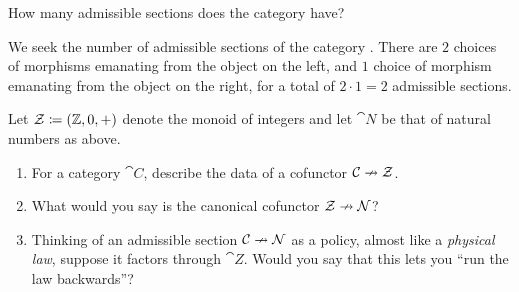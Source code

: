 \documentclass[Book-Poly]{subfiles}
\begin{document}
\begin{exercise}
How many admissible sections does the category \fbox{$\bullet\to\bullet$} have?
\begin{solution}
We seek the number of admissible sections of the category \fbox{$\bullet\to\bullet$}.
There are $2$ choices of morphisms emanating from the object on the left, and $1$ choice of morphism emanating from the object on the right, for a total of $2 \cdot 1 = 2$ admissible sections.
\end{solution}
\end{exercise}

\begin{exercise}
Let $\mathcal{Z}\coloneqq(\mathbb{Z},0,+)$ denote the monoid of integers and let $\cat{N}$ be that of natural numbers as above.
\begin{enumerate}
	\item For a category $\cat{C}$, describe the data of a cofunctor $\mathcal{C}\nrightarrow\mathcal{Z}$.
	\item What would you say is the canonical cofunctor $\mathcal{Z}\nrightarrow\mathcal{N}$?
	\item Thinking of an admissible section $\mathcal{C}\nrightarrow\mathcal{N}$ as a policy, almost like a \emph{physical law}, suppose it factors through $\cat{Z}$. Would you say that this lets you ``run the law backwards''?
\qedhere
\end{enumerate}
\end{exercise}
\end{document}
